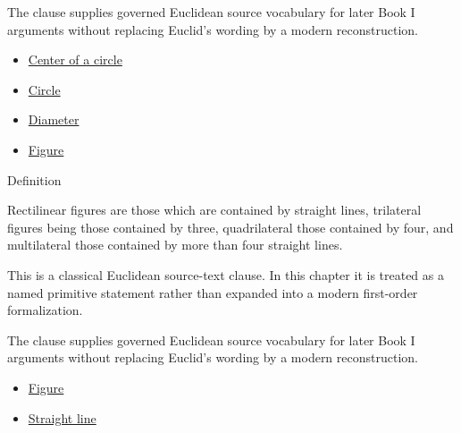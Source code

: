 \begin{remark*}[Interpretation]
The clause supplies governed Euclidean source vocabulary for later Book I
arguments without replacing Euclid's wording by a modern reconstruction.
\end{remark*}

\begin{lra-not-visible}
\begin{dependencies}
\begin{itemize}
  \item \hyperref[def:euclid-center-of-a-circle]{Center of a circle}
  \item \hyperref[def:euclid-circle]{Circle}
  \item \hyperref[def:euclid-diameter]{Diameter}
  \item \hyperref[def:euclid-figure]{Figure}
\end{itemize}
\end{dependencies}
\end{lra-not-visible}

\begin{definitionbox}{Definition}
\begin{definition}
\label{def:euclid-rectilinear-figures}
Rectilinear figures are those which are contained by straight lines, trilateral
figures being those contained by three, quadrilateral those contained by four,
and multilateral those contained by more than four straight lines.
\end{definition}
\end{definitionbox}
\begin{remark*}
This is a classical Euclidean source-text clause. In this chapter it is treated
as a named primitive statement rather than expanded into a modern first-order
formalization.
\end{remark*}

\begin{remark*}[Interpretation]
The clause supplies governed Euclidean source vocabulary for later Book I
arguments without replacing Euclid's wording by a modern reconstruction.
\end{remark*}

\begin{lra-not-visible}
\begin{dependencies}
\begin{itemize}
  \item \hyperref[def:euclid-figure]{Figure}
  \item \hyperref[def:euclid-straight-line]{Straight line}
\end{itemize}
\end{dependencies}
\end{lra-not-visible}

